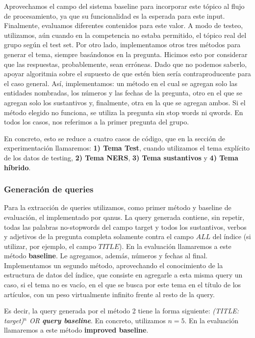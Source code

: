 Aprovechamos el campo  del sistema baseline para incorporar este tópico al flujo de procesamiento, ya que su funcionalidad es la esperada para este input.
Finalmente, evaluamos diferentes contenidos para este valor. A modo de testeo, utilizamos, aún cuando en la competencia no estaba permitido, el tópico real del grupo según el test set. Por otro lado, implementamos otros tres métodos para generar el tema, siempre basándonos en la pregunta. Hicimos esto por considerar que las respuestas, probablemente, sean erróneas. Dado que no podemos saberlo, apoyar algoritmia sobre el supuesto de que estén bien sería contraproducente para el caso general. Así, implementamos: un método en el cual se agregan solo las entidades nombradas, los números y las fechas de la pregunta, otro en el que se agregan solo los sustantivos y, finalmente, otra en la que se agregan ambos. Si el método elegido no funciona, se utiliza la pregunta sin stop words ni qwords. En todos los casos, nos referimos a la primer pregunta del grupo.

En concreto, esto se reduce a cuatro casos de código, que en la sección de experimentación llamaremos: \textbf{1) Tema Test}, cuando utilizamos el tema explícito de los datos de testing, \textbf{2) Tema NERS}, \textbf{3) Tema sustantivos} y \textbf{4) Tema híbrido}.

\subsubsection{Generación de queries}

Para la extracción de queries utilizamos, como primer método y baseline de evaluación, el implementado por qanus. La query generada contiene, sin repetir, todas las palabras no-stopwords del campo target y todos los sustantivos, verbos y adjetivos de la pregunta completa solamente contra el campo $ALL$ del índice (si utilizar, por ejemplo, el campo $TITLE$). En la evaluación llamaremos a este método \textbf{baseline}. Le agregamos, además, números y fechas al final. Implementamos un segundo método, aprovechando el conocimiento de la estructura de datos del índice, que consiste en agregarle a esta misma query un caso, si el tema no es vacío, en el que se busca por este tema en el título de los artículos, con un peso virtualmente infinito frente al resto de la query.

Es decir, la query generada por el método 2 tiene la forma siguiente: \textit{(TITLE: target)$^n$ OR \textbf{query baseline}}. En concreto, utilizamos $n=5$. En la evaluación llamaremos a este método \textbf{improved baseline}.

